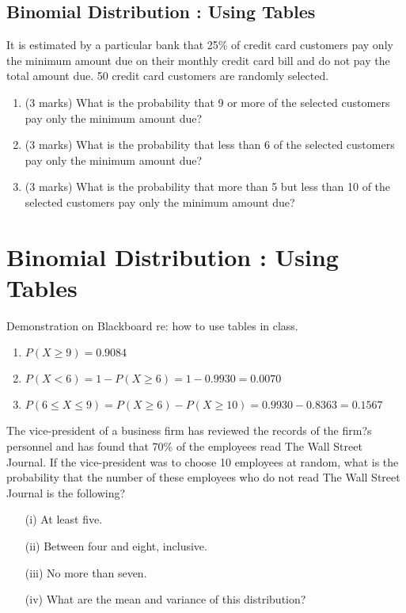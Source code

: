 \documentclass[]{report}
\begin{document}
{
\subsection{Binomial Distribution : Using Tables}
	It is estimated by a particular bank that 25\% of credit card customers pay only the minimum amount due on their monthly credit card bill and do not pay the total amount due. 50 credit card customers are randomly selected.
	\begin{enumerate}
		\item (3 marks)	What is the probability that 9 or more of the selected customers pay only the minimum amount due?
		\item (3 marks) What is the probability that less than 6 of the selected customers pay only the minimum amount due?
		\item (3 marks)	What is the probability that more than 5 but less than 10 of the selected customers pay only the minimum amount due?
	\end{enumerate}
}
\section{Binomial Distribution : Using Tables}
	Demonstration on Blackboard re: how to use tables in class.
	\begin{enumerate}
		\item $P(X \geq 9) = 0.9084$
		\item $P(X < 6) = 1- P(X \geq 6) =1 - 0.9930 = 0.0070$
		\item $P(6 \leq X \leq 9) = P(X \geq 6) - P(X \geq 10) = 0.9930 - 0.8363 = 0.1567$
	\end{enumerate}
	


The vice-president of a business firm has reviewed the records of the firm?s personnel and has found that 70\% of the employees read The Wall Street Journal.
If the vice-president was to choose 10 employees at random, what is the probability that the number of these employees who do not read The Wall Street Journal is the following?
\begin{itemize} 
	\item[(i)]              At least five.
	\item[(ii)]             Between four and eight, inclusive.
	\item[(iii)]             No more than seven.
	\item[(iv) ]            What are the mean and variance of this distribution?
\end{itemize}
\end{document}
